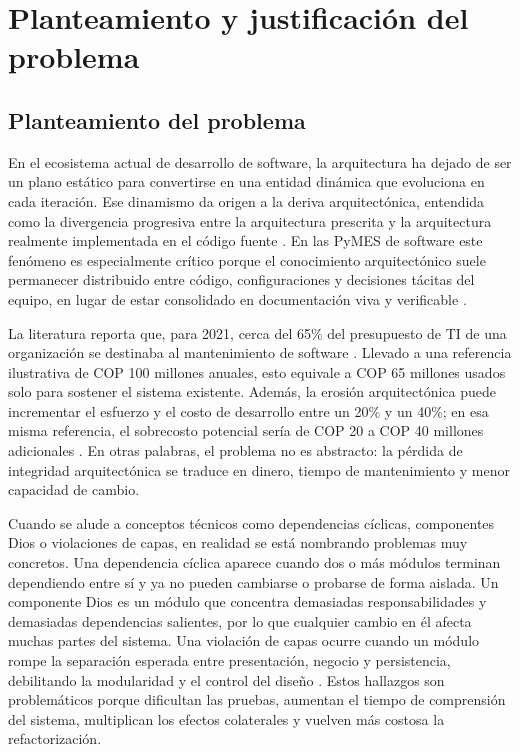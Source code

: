 \section{Planteamiento y justificación del problema}

\subsection{Planteamiento del problema}
En el ecosistema actual de desarrollo de software, la arquitectura ha dejado de ser un plano estático para convertirse en una entidad dinámica que evoluciona en cada iteración. Ese dinamismo da origen a la deriva arquitectónica, entendida como la divergencia progresiva entre la arquitectura prescrita y la arquitectura realmente implementada en el código fuente \parencite{SanMartin}. En las PyMES de software este fenómeno es especialmente crítico porque el conocimiento arquitectónico suele permanecer distribuido entre código, configuraciones y decisiones tácitas del equipo, en lugar de estar consolidado en documentación viva y verificable \parencite{Hamed2023, Anthony2024, Manglaras2026}.

La literatura reporta que, para 2021, cerca del 65\% del presupuesto de TI de una organización se destinaba al mantenimiento de software \parencite{Pigazzini2021}. Llevado a una referencia ilustrativa de COP 100 millones anuales, esto equivale a COP 65 millones usados solo para sostener el sistema existente. Además, la erosión arquitectónica puede incrementar el esfuerzo y el costo de desarrollo entre un 20\% y un 40\%; en esa misma referencia, el sobrecosto potencial sería de COP 20 a COP 40 millones adicionales \parencite{Pigazzini2021, Jolak2025}. En otras palabras, el problema no es abstracto: la pérdida de integridad arquitectónica se traduce en dinero, tiempo de mantenimiento y menor capacidad de cambio.

Cuando se alude a conceptos técnicos como dependencias cíclicas, componentes Dios o violaciones de capas, en realidad se está nombrando problemas muy concretos. Una dependencia cíclica aparece cuando dos o más módulos terminan dependiendo entre sí y ya no pueden cambiarse o probarse de forma aislada. Un componente Dios es un módulo que concentra demasiadas responsabilidades y demasiadas dependencias salientes, por lo que cualquier cambio en él afecta muchas partes del sistema. Una violación de capas ocurre cuando un módulo rompe la separación esperada entre presentación, negocio y persistencia, debilitando la modularidad y el control del diseño \parencite{SasAvgeriou, Klein2022}. Estos hallazgos son problemáticos porque dificultan las pruebas, aumentan el tiempo de comprensión del sistema, multiplican los efectos colaterales y vuelven más costosa la refactorización.

